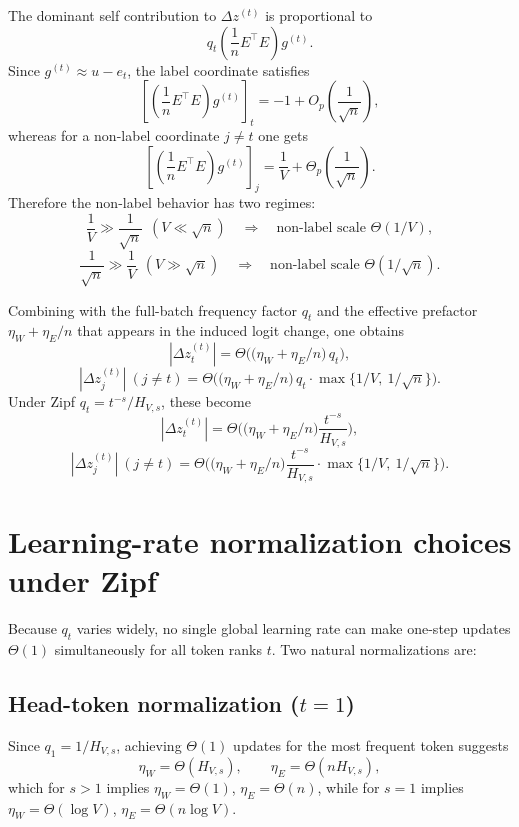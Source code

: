 \documentclass[11pt]{article}
\begin{document}
The dominant self contribution to $\Delta z^{(t)}$ is proportional to
\[
q_t\left(\frac{1}{n}E^\top E\right)g^{(t)}.
\]
Since $g^{(t)}\approx u-e_t$, the label coordinate satisfies
\[
\left[\left(\frac{1}{n}E^\top E\right)g^{(t)}\right]_t = -1 + O_p\!\left(\frac{1}{\sqrt{n}}\right),
\]
whereas for a non-label coordinate $j\neq t$ one gets
\[
\left[\left(\frac{1}{n}E^\top E\right)g^{(t)}\right]_j
= \frac{1}{V} + \Theta_p\!\left(\frac{1}{\sqrt{n}}\right).
\]
Therefore the non-label behavior has two regimes:
\[
\frac{1}{V} \gg \frac{1}{\sqrt{n}} \ \ (V\ll \sqrt{n})\quad \Longrightarrow\quad
\text{non-label scale } \Theta(1/V),
\]
\[
\frac{1}{\sqrt{n}} \gg \frac{1}{V} \ \ (V\gg \sqrt{n})\quad \Longrightarrow\quad
\text{non-label scale } \Theta(1/\sqrt{n}).
\]

Combining with the full-batch frequency factor $q_t$ and the effective prefactor
$\eta_W+\eta_E/n$ that appears in the induced logit change, one obtains
\[
|\Delta z^{(t)}_t|
= \Theta\!\Big(\big(\eta_W+\eta_E/n\big)\,q_t\Big),
\]
\[
|\Delta z^{(t)}_j| \ (j\neq t)
= \Theta\!\Big(\big(\eta_W+\eta_E/n\big)\,q_t\cdot \max\{1/V,\ 1/\sqrt{n}\}\Big).
\]
Under Zipf $q_t=t^{-s}/H_{V,s}$, these become
\[
|\Delta z^{(t)}_t|
= \Theta\!\Big(\big(\eta_W+\eta_E/n\big)\frac{t^{-s}}{H_{V,s}}\Big),
\]
\[
|\Delta z^{(t)}_j| \ (j\neq t)
= \Theta\!\Big(\big(\eta_W+\eta_E/n\big)\frac{t^{-s}}{H_{V,s}}\cdot \max\{1/V,\ 1/\sqrt{n}\}\Big).
\]

\section{Learning-rate normalization choices under Zipf}

Because $q_t$ varies widely, no single global learning rate can make one-step updates
$\Theta(1)$ simultaneously for all token ranks $t$. Two natural normalizations are:

\subsection{Head-token normalization ($t=1$)}
Since $q_1 = 1/H_{V,s}$, achieving $\Theta(1)$ updates for the most frequent token suggests
\[
\eta_W = \Theta(H_{V,s}),\qquad \eta_E = \Theta(n H_{V,s}),
\]
which for $s>1$ implies $\eta_W=\Theta(1)$, $\eta_E=\Theta(n)$, while for $s=1$ implies
$\eta_W=\Theta(\log V)$, $\eta_E=\Theta(n\log V)$.
\end{document}
